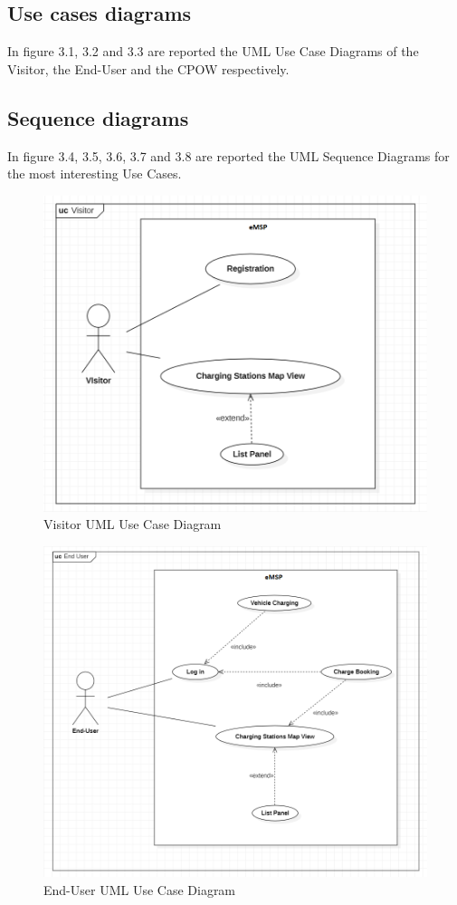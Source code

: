 \documentclass[a4paper]{report}
\begin{document}
\subsection{Use cases diagrams }
In figure 3.1, 3.2 and 3.3 are reported the UML Use Case Diagrams of the Visitor, the End-User and the CPOW respectively.
\subsection{Sequence diagrams }
In figure 3.4, 3.5, 3.6, 3.7 and 3.8 are reported the UML Sequence Diagrams for the most interesting Use Cases.
\begin{figure}[p]
\includegraphics[width=\textwidth]{RASD/img/UC_Visitor}
\caption{Visitor UML Use Case Diagram}
\label{fig:class-diagramRASD}
\end{figure}
\restoregeometry

\begin{figure}[p]
\includegraphics[width=\textwidth]{RASD/img/UC_EndUser.png}
\caption{End-User UML Use Case Diagram}
\label{fig:class-diagramRASD}
\end{figure}
\end{document}
